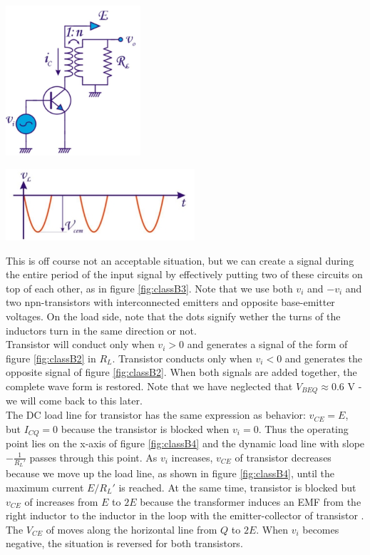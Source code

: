 \begin{minipage}{.5\textwidth}
	\centering
	\includegraphics[width=5cm]{figures/ch09/classB1.jpg}
	\label{fig:classB1}
\end{minipage}%
\begin{minipage}{.5\textwidth}
	\centering
	\includegraphics[width=7cm]{figures/ch09/classB2.jpg}
	\label{fig:classB2}
\end{minipage}

This is off course not an acceptable situation, but we can create a signal during the entire period of the input signal by effectively putting two of these circuits on top of each other, as in figure \ref{fig:classB3}. Note that we use both $v_i$ and $-v_i$ and two npn-transistors with interconnected emitters and opposite base-emitter voltages. On the load side, note that the dots signify wether the turns of the inductors turn in the same direction or not. \\
Transistor  will conduct only when $v_i > 0$ and generates a signal of the form of figure \ref{fig:classB2} in $R_L$. Transistor  conducts only when $v_i < 0$ and generates the opposite signal of figure \ref{fig:classB2}. When both signals are added together, the complete wave form is restored. Note that we have neglected that $V_{BEQ} \approx 0.6$ V - we will come back to this later.\\
The DC load line for transistor  has the same expression as behavior: $v_{CE} = E$, but $I_{CQ} = 0$ because the transistor is blocked when $v_i = 0$. Thus the operating point lies on the x-axis of figure \ref{fig:classB4} and the dynamic load line with slope $-\frac{1}{R_L'}$ passes through this point. As $v_i$ increases, $v_{CE}$ of transistor  decreases because we move up the load line, as shown in figure \ref{fig:classB4}, until the maximum current $E/R_L'$ is reached. At the same time, transistor  is blocked but $v_{CE}$ of  increases from $E$ to $2E$ because the transformer induces an EMF from the right inductor to the inductor in the loop with the emitter-collector of transistor . The $V_{CE}$ of  moves along the horizontal line from $Q$ to $2E$. When $v_i$ becomes negative, the situation is reversed for both transistors.


